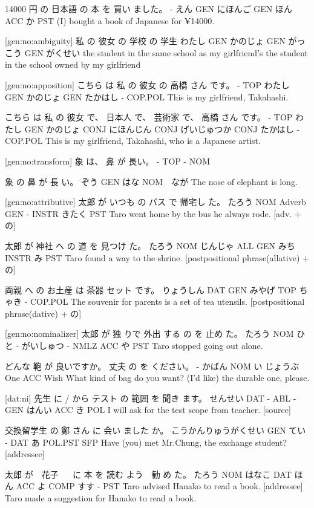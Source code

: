 14000 円  の  日本語   の  本   を  買い ました。
-    えん GEN にほんご GEN ほん ACC か   PST
(I) bought a book of Japanese for ¥14000.

[gen:no:ambiguity]
私    の   彼女    の  学校     の  学生
わたし GEN かのじょ GEN がっこう GEN がくせい
the student in the same school as my girlfriend's
the student in the school owned by my girlfriend

[gen:no:apposition]
こちら は 私     の  彼女    の  高橋   さん です。
-    TOP わたし GEN かのじょ GEN たかはし - COP.POL
This is my girlfriend, Takahashi.

こちら は  私    の  彼女    で、  日本人    で、  芸術家      で、  高橋   さん です。
-    TOP わたし GEN かのじょ CONJ にほんじん CONJ げいじゅつか CONJ たかはし - COP.POL
This is my girlfriend, Takahashi, who is a Japanese artist.

[gen:no:transform]
象 は、 鼻 が  長い。
-  TOP - NOM

象   の   鼻  が   長 い。
ぞう GEN はな NOM　なが
The nose of elephant is long.

[gen:no:attributive]
太郎   が   いつも  の  バス で   帰宅し た。
たろう NOM Adverb GEN  - INSTR きたく PST
Taro went home by the bus he always rode. [adv. + の]

太郎   が  神社    へ   の  道   を    見つけ た。
たろう NOM じんじゃ ALL GEN みち INSTR み    PST
Taro found a way to the shrine. [postpositional phrase(allative) + の]

両親      へ  の   お土産  は   茶器 セット です。
りょうしん DAT GEN  みやげ TOP ちゃき -  COP.POL
The souvenir for parents is a set of tea utensils. [postpositional phrase(dative) + の]

[gen:no:nominalizer]
太郎   が  独 りで 外出 する   の    を  止め た。
たろう NOM ひと - がいしゅつ - NMLZ ACC や PST
Taro stopped going out alone.

どんな 鞄   が   良いですか。 丈夫    の  を ください。
-    かばん NOM い         じょうぶ One ACC Wish
What kind of bag do you want? (I'd like) the durable one, please.

[dat:ni]
先生     に  / から テスト の 範囲    を  聞き ます。
せんせい DAT - ABL  -   GEN はんい ACC  き   POL
I will ask for the test scope from teacher. [source]

交換留学生           の  鄭 さん に 会い ました    か。
こうかんりゅうがくせい GEN てい - DAT あ  POL.PST SFP
Have (you) met Mr.Chung, the exchange student? [addressee]

太郎   が　花子 　 に  本   を  読む よう　勧 め た。
たろう NOM はなこ DAT ほん ACC よ  COMP すす - PST
Taro advised Hanako to read a book. [addressee]
Taro made a suggestion for Hanako to read a book.

